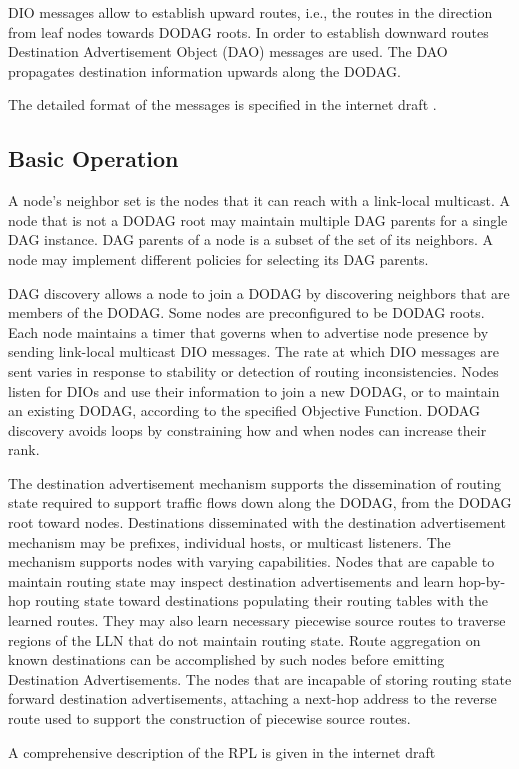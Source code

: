 DIO messages allow to establish upward routes, i.e., the routes in the direction from leaf nodes towards DODAG roots.  In order to establish downward routes Destination Advertisement Object (DAO) messages are used. The DAO propagates destination information upwards along the DODAG. 

The detailed format of the messages is specified in the internet draft \cite{draft-rpl-04}.

\subsection{Basic Operation}
A node's neighbor set is the nodes that it can reach with a link-local multicast. A node that is not a DODAG root may maintain multiple DAG parents for a single DAG instance. DAG parents of a node is a subset of the set of       its neighbors. A node may implement different policies for selecting its DAG parents. 

DAG discovery allows a node to join a DODAG by discovering neighbors that are members of the DODAG.  Some nodes are preconfigured to be DODAG roots. Each node maintains a timer that governs when to advertise node presence by sending link-local multicast DIO messages. The rate at which DIO messages are sent varies in response to stability or detection of routing inconsistencies. Nodes listen for DIOs and use their information to join a new DODAG, or to maintain an existing DODAG, according to the specified Objective Function. DODAG discovery avoids loops by constraining how and when nodes can increase their rank.

The destination advertisement mechanism supports the dissemination of routing state required to support traffic flows down along the DODAG, from the DODAG root toward nodes. Destinations disseminated with the destination advertisement mechanism may be prefixes, individual hosts, or multicast listeners.  The mechanism supports nodes with varying capabilities. Nodes that are capable to maintain routing state may inspect destination advertisements and learn hop-by-hop routing state toward destinations populating their routing tables with the learned routes. They may also learn necessary piecewise source routes to traverse regions of the LLN that do not maintain routing state. Route aggregation on known destinations can be accomplished by such nodes before emitting Destination Advertisements. The nodes that are incapable of storing routing state forward destination advertisements, attaching a next-hop address to the reverse route used to support the construction of piecewise source routes.

A comprehensive description of the RPL is given in the internet draft \cite{draft-rpl-04}